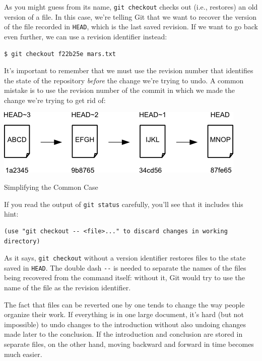 \documentclass{book}
\begin{document}
As you might guess from its name, \texttt{git checkout} checks out
(i.e., restores) an old version of a file. In this case, we're telling
Git that we want to recover the version of the file recorded in
\texttt{HEAD}, which is the last saved revision. If we want to go back
even further, we can use a revision identifier instead:

\begin{verbatim}
$ git checkout f22b25e mars.txt
\end{verbatim}

It's important to remember that we must use the revision number that
identifies the state of the repository \emph{before} the change we're
trying to undo. A common mistake is to use the revision number of the
commit in which we made the change we're trying to get rid of:

\includegraphics{novice/git/img/git-when-revisions-updated.png}

\begin{swcbox}{Simplifying the Common Case}

If you read the output of \texttt{git status} carefully, you'll see that
it includes this hint:

\begin{verbatim}
(use "git checkout -- <file>..." to discard changes in working directory)
\end{verbatim}

As it says, \texttt{git checkout} without a version identifier restores
files to the state saved in \texttt{HEAD}. The double dash \texttt{-{}-}
is needed to separate the names of the files being recovered from the
command itself: without it, Git would try to use the name of the file as
the revision identifier.

\end{swcbox}

The fact that files can be reverted one by one tends to change the way
people organize their work. If everything is in one large document, it's
hard (but not impossible) to undo changes to the introduction without
also undoing changes made later to the conclusion. If the introduction
and conclusion are stored in separate files, on the other hand, moving
backward and forward in time becomes much easier.
\end{document}
